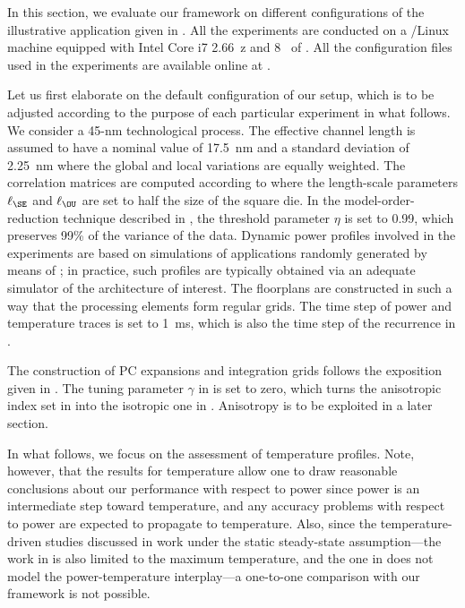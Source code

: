 In this section, we evaluate our framework on different configurations of the
illustrative application given in . All the
experiments are conducted on a /Linux machine equipped with Intel Core
i7 2.66~z and 8~ of . All the configuration files used in
the experiments are available online at \cite{eslab2014b}.

Let us first elaborate on the default configuration of our setup, which is to be
adjusted according to the purpose of each particular experiment in what follows.
We consider a 45-nm technological process. The effective channel length is
assumed to have a nominal value of 17.5~nm \cite{ptm} and a standard deviation
of 2.25~nm where the global and local variations are equally weighted. The
correlation matrices are computed according to 
where the length-scale parameters $\ell_\SE$ and $\ell_\OU$ are set to half the
size of the square die. In the model-order-reduction technique described in
, the threshold parameter $\eta$ is set to
0.99, which preserves 99\% of the variance of the data. Dynamic power profiles
involved in the experiments are based on simulations of applications randomly
generated by means of  \cite{dick1998}; in practice, such profiles are
typically obtained via an adequate simulator of the architecture of interest.
The floorplans are constructed in such a way that the processing elements form
regular grids. The time step of power and temperature traces is set to 1~ms,
which is also the time step of the recurrence in .

The construction of \ac{PC} expansions and integration grids follows the
exposition given in . The tuning parameter $\gamma$ in
 is set to zero, which turns the anisotropic
index set in  into the isotropic one in
. Anisotropy is to be exploited in a later
section.

In what follows, we focus on the assessment of temperature profiles. Note,
however, that the results for temperature allow one to draw reasonable
conclusions about our performance with respect to power since power is an
intermediate step toward temperature, and any accuracy problems with respect to
power are expected to propagate to temperature. Also, since the
temperature-driven studies \cite{huang2009a, juan2011, juan2012, lee2013}
discussed in  work under the static steady-state
assumption---the work in \cite{juan2011} is also limited to the maximum
temperature, and the one in \cite{huang2009a} does not model the
power-temperature interplay---a one-to-one comparison with our framework is not
possible.

